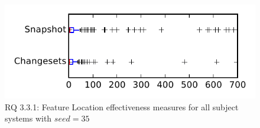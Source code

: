 
\begin{figure}
\centering
\includegraphics[height=0.4\textheight]{figures/flt_seed/rq1_tiny_35}
\caption{RQ 3.3.1: Feature Location effectiveness measures for all subject systems with $seed=35$}
\label{fig:flt_seed:rq1:tiny}
\end{figure}
